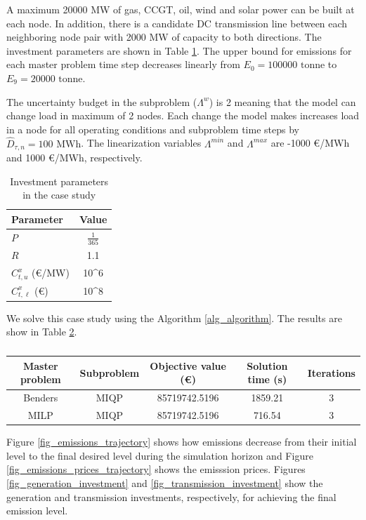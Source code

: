 \documentclass[final]{IEEEtran}
\begin{document}
A maximum 20000 MW of gas, CCGT, oil, wind and solar power can be built at each node. In addition, there is a candidate DC transmission line between each neighboring node pair with 2000 MW of capacity to both directions. The investment parameters are shown in Table \ref{table_investment_parameters}. The upper bound for emissions for each master problem time step decreases linearly from $E_{0} = 100000 \textrm{ tonne}$ to $E_{9} = 20000 \textrm{ tonne}$.

The uncertainty budget in the subproblem ($\Lambda^w$) is 2 meaning that the model can change load in maximum of 2 nodes. Each change the model makes increases load in a node for all operating conditions and subproblem time steps by $\hat{D}_{\tau, n} = 100 \textrm{ MWh}$. The linearization variables $\Lambda^{min}$ and $\Lambda^{max}$ are -1000 €/MWh and 1000 €/MWh, respectively.

\begin{table}[htpb]
\centering
\begin{tabular}{l| c} \hline
Parameter 				& Value  \\ \hline
$P$ 					& $\frac{1}{365}$ \\
$R$						& 1.1		\\
$C^x_{t, u}$ (€/MW)		& 10^6    \\
$C^x_{t, \ell}$ (€)		& 10^8	\\
\end{tabular}
\caption{Investment parameters in the case study}
\label{table_investment_parameters}
\end{table}

We solve this case study using the Algorithm \ref{alg_algorithm}. The results are show in Table \ref{table_results}.

\begin{table}[htpb]
\centering
\begin{tabular}{c c| c c c} \hline
Master problem 			& Subproblem & Objective value (€) 	& Solution time (s) 	& Iterations \\ \hline
Benders					& MIQP 				& 85719742.5196 		& 1859.21				& 3				 \\
MILP					& MIQP 				& 85719742.5196 		& 716.54				& 3				 \\
\end{tabular}
\caption{}
\label{table_results}
\end{table}

Figure \ref{fig_emissions_trajectory} shows how emissions decrease from their initial level to the final desired level during the simulation horizon and Figure \ref{fig_emissions_prices_trajectory} shows the emisssion prices. Figures \ref{fig_generation_investment} and \ref{fig_transmission_investment} show the generation and transmission investments, respectively, for achieving the final emission level.
\end{document}
